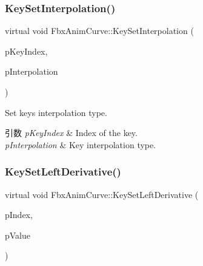 \subsubsection{\texorpdfstring{Key\+Set\+Interpolation()}{KeySetInterpolation()}}
{\footnotesize\ttfamily virtual void Fbx\+Anim\+Curve\+::\+Key\+Set\+Interpolation (\begin{DoxyParamCaption}\item[{int}]{p\+Key\+Index,  }\item[{\hyperlink{class_fbx_anim_curve_def_add2ab7d10d856ab0868cc9b143d59ea5}{Fbx\+Anim\+Curve\+Def\+::\+E\+Interpolation\+Type}}]{p\+Interpolation }\end{DoxyParamCaption})\hspace{0.3cm}{\ttfamily [pure virtual]}}

Set key\textquotesingle{}s interpolation type. 
\begin{DoxyParams}{引数}
{\em p\+Key\+Index} & Index of the key. \\
\hline
{\em p\+Interpolation} & Key interpolation type. \\
\hline
\end{DoxyParams}
\mbox{\label{class_fbx_anim_curve_afbec5f6b274395cb1a3d8d1eb379982f}} 
\subsubsection{\texorpdfstring{Key\+Set\+Left\+Derivative()}{KeySetLeftDerivative()}}
{\footnotesize\ttfamily virtual void Fbx\+Anim\+Curve\+::\+Key\+Set\+Left\+Derivative (\begin{DoxyParamCaption}\item[{int}]{p\+Index,  }\item[{float}]{p\+Value }\end{DoxyParamCaption})\hspace{0.3cm}{\ttfamily [pure virtual]}}

